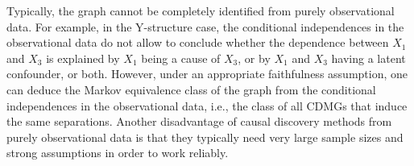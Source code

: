 Typically, the graph cannot be completely identified from purely observational data.
For example, in the Y-structure case, the conditional independences in the observational data
do not allow to conclude whether the dependence between $X_1$ and $X_3$ is explained by
$X_1$ being a cause of $X_3$, or by $X_1$ and $X_3$ having a latent confounder,
or both.
However, under an appropriate faithfulness assumption, one can deduce the Markov
equivalence class of the graph from the conditional independences in the observational data, 
i.e., the class of all CDMGs that induce the same separations.
Another disadvantage of causal discovery methods from purely observational data is that
they typically need very large sample sizes and strong assumptions in order to work reliably.

\begin{figure}\centering
\end{figure}
